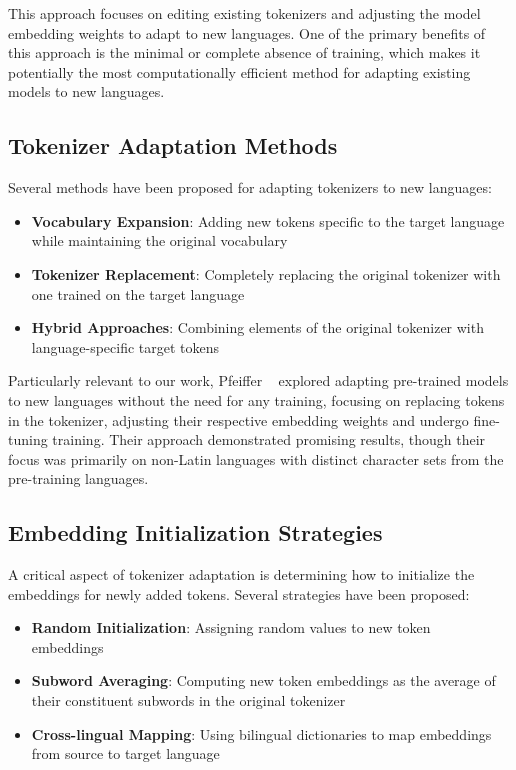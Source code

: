 This approach focuses on editing existing tokenizers and adjusting the model embedding weights to adapt to new languages. One of the primary benefits of this approach is the minimal or complete absence of training, which makes it potentially the most computationally efficient method for adapting existing models to new languages.

\subsection{Tokenizer Adaptation Methods}
Several methods have been proposed for adapting tokenizers to new languages:

\begin{itemize}
    \item \textbf{Vocabulary Expansion}: Adding new tokens specific to the target language while maintaining the original vocabulary~\cite{martinez2022tuning}
    
    \item \textbf{Tokenizer Replacement}: Completely replacing the original tokenizer with one trained on the target language~\cite{rust2020tokenizer}
    
    \item \textbf{Hybrid Approaches}: Combining elements of the original tokenizer with language-specific target tokens~\cite{AdaptinigPretrainedModels}
\end{itemize}

Particularly relevant to our work, Pfeiffer ~\cite{AdaptinigPretrainedModels} explored adapting pre-trained models to new languages without the need for any training, focusing on replacing tokens in the tokenizer, adjusting their respective embedding weights and undergo fine-tuning training. Their approach demonstrated promising results, though their focus was primarily on non-Latin languages with distinct character sets from the pre-training languages.

\subsection{Embedding Initialization Strategies}
A critical aspect of tokenizer adaptation is determining how to initialize the embeddings for newly added tokens. Several strategies have been proposed:

\begin{itemize}
    \item \textbf{Random Initialization}: Assigning random values to new token embeddings~\cite{jiti2021bertweet}
    
    \item \textbf{Subword Averaging}: Computing new token embeddings as the average of their constituent subwords in the original tokenizer~\cite{AdaptinigPretrainedModels}
    
    \item \textbf{Cross-lingual Mapping}: Using bilingual dictionaries to map embeddings from source to target language~\cite{artetxe2018robust}
\end{itemize}

